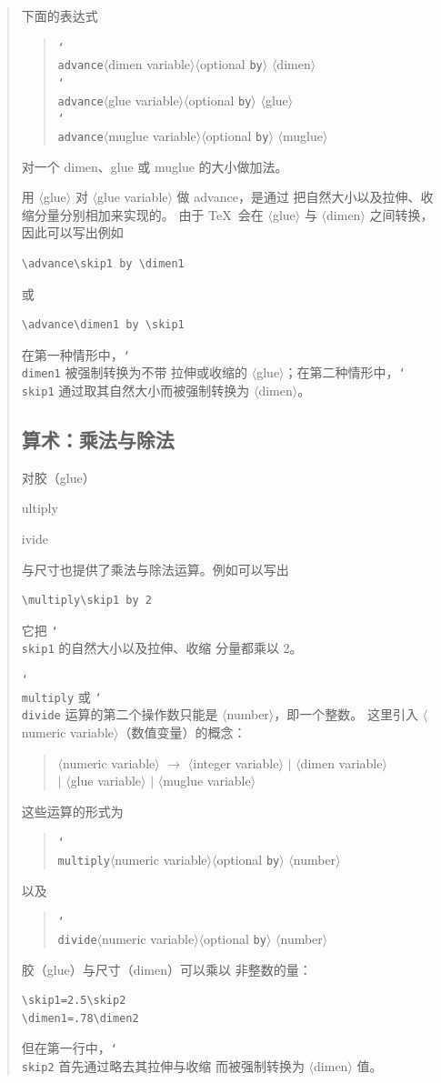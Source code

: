\documentclass[a4paper]{rapport3}
\makeatletter
\def\nl{\protect\\}\def\n#1{{\tt #1}}\def\cs#1{{\tt\char`\\#1}}\let\csc\cs
\def\gr#1{$\langle$#1$\rangle$}\def\key#1{{\tt#1}}
\newenvironment{disp}{\begin{quotation}}{\end{quotation}}
\newenvironment{Disp}{\begin{quotation}}{\end{quotation}}
\def\cstoidx#1\par{\index{#1@\cs{#1}}}
\makeatother
\begin{document}
\begin{disp}
下面的表达式
\begin{Disp}\cs{advance}\gr{dimen variable}\gr{optional \n{by}}%
     \gr{dimen}\nl
     \cs{advance}\gr{glue variable}\gr{optional \n{by}}%
     \gr{glue}\nl
     \cs{advance}\gr{muglue variable}\gr{optional \n{by}}%
     \gr{muglue}\end{Disp}
对一个 dimen、glue 或 muglue 的大小做加法。

用 \gr{glue} 对 \gr{glue variable} 做 advance，是通过
把自然大小以及拉伸、收缩分量分别相加来实现的。
由于 \TeX\ 会在 \gr{glue} 与 \gr{dimen} 之间转换，
因此可以写出例如
\begin{verbatim}
\advance\skip1 by \dimen1
\end{verbatim}
或
\begin{verbatim}
\advance\dimen1 by \skip1
\end{verbatim}
在第一种情形中，\cs{dimen1} 被强制转换为不带
拉伸或收缩的 \gr{glue}；在第二种情形中，\cs{skip1}
通过取其自然大小而被强制转换为 \gr{dimen}。

\subsection{算术：乘法与除法}

对胶（glue）\cstoidx multiply\par\cstoidx divide\par
与尺寸也提供了乘法与除法运算。例如可以写出
\begin{verbatim}
\multiply\skip1 by 2
\end{verbatim}
它把 \cs{skip1} 的自然大小以及拉伸、收缩
分量都乘以 2。

\cs{multiply} 或 \cs{divide}
运算的第二个操作数只能是 \gr{number}，即一个整数。
这里引入 \gr{numeric variable}（数值变量）的概念：
\begin{disp}\gr{numeric variable} $\longrightarrow$ \gr{integer variable}
     $|$ \gr{dimen variable} \nl
     \indent $|$ \gr{glue variable} $|$ \gr{muglue variable}\end{disp}
这些运算的形式为
\begin{Disp}\cs{multiply}\gr{numeric variable}\gr{optional \n{by}}%
\gr{number}\end{Disp} 
以及
\begin{Disp}\cs{divide}\gr{numeric variable}\gr{optional \n{by}}%
\gr{number}\end{Disp}

胶（glue）与尺寸（dimen）可以乘以
非整数的量：
\begin{verbatim}
\skip1=2.5\skip2
\dimen1=.78\dimen2
\end{verbatim}
但在第一行中，\cs{skip2} 首先通过略去其拉伸与收缩
而被强制转换为 \gr{dimen} 值。


\end{disp}
\end{document}
